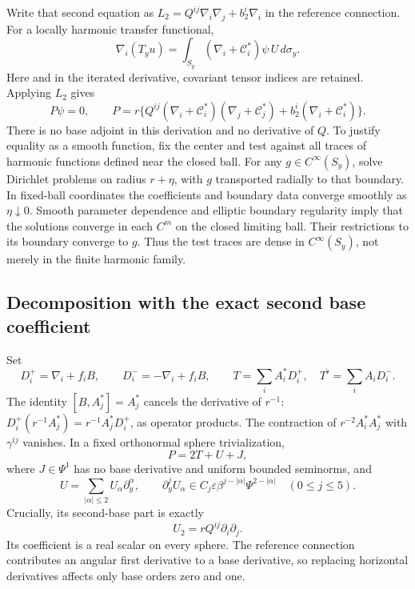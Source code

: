 \documentclass[11pt]{article}
\theoremstyle{definition}
\theoremstyle{remark}
\numberwithin{equation}{section}
\begin{document}
Write that second equation as
$L_2=Q^{ij}\nabla_i\nabla_j+b_2^i\nabla_i$ in the reference connection.
For a locally harmonic transfer functional,
\[
 \nabla_i(T_yu)
 =\int_{S_y}(\nabla_i+\mathcal C_i^*)\psi\,U\,d\sigma_y.
\]
Here and in the iterated derivative, covariant tensor indices are retained.
Applying $L_2$ gives
\begin{equation}\label{angular-expanded:P-equation}
 P\psi=0,\qquad
 P=r\{Q^{ij}(\nabla_i+\mathcal C_i^*)
                  (\nabla_j+\mathcal C_j^*)
                   +b_2^i(\nabla_i+\mathcal C_i^*)\}.
\end{equation}
There is no base adjoint in this derivation and no derivative of $Q$.
To justify equality as a smooth function, fix the center and test against
all traces of harmonic functions defined near the closed ball.  For any
$g\in C^\infty(S_y)$, solve Dirichlet problems on radius $r+\eta$, with
$g$ transported radially to that boundary.  In fixed-ball coordinates the
coefficients and boundary data converge smoothly as $\eta\downarrow0$.
Smooth parameter dependence and elliptic boundary regularity imply that
the solutions converge in each $C^m$ on the closed limiting ball.  Their
restrictions to its boundary converge to $g$.  Thus the test traces are
dense in $C^\infty(S_y)$, not merely in the finite harmonic family.

\subsection{Decomposition with the exact second base coefficient}

Set
\begin{equation}\label{angular-expanded:T-definition}
 D_i^+=\nabla_i+f_iB,\qquad D_i^-=-\nabla_i+f_iB,\qquad
 T=\sum_iA_i^*D_i^+,\quad T^\flat=\sum_iA_iD_i^-.
\end{equation}
The identity $[B,A_j^*]=A_j^*$ cancels the derivative of $r^{-1}$:
$D_i^+(r^{-1}A_j^*)=r^{-1}A_j^*D_i^+$, as operator products.
The contraction of $r^{-2}A_i^*A_j^*$ with $\gamma^{ij}$ vanishes.
In a fixed orthonormal sphere trivialization,
\begin{equation}\label{angular-expanded:P-decomposition}
 P=2T+U+J,
\end{equation}
where $J\in\Psi^1$ has no base derivative and uniform bounded seminorms,
and
\begin{equation}\label{angular-expanded:U-bounds}
 U=\sum_{|\alpha|\leq2}U_\alpha\partial_y^\alpha,
 \qquad
 \partial_y^jU_\alpha\in
 C_j\varepsilon\beta^{j-|\alpha|}\Psi^{2-|\alpha|}
 \quad(0\leq j\leq5).
\end{equation}
Crucially, its second-base part is exactly
\begin{equation}\label{angular-expanded:real-principal-part}
 U_2=rQ^{ij}\partial_i\partial_j.
\end{equation}
Its coefficient is a real scalar on every sphere.  The reference
connection contributes an angular first derivative to a base derivative,
so replacing horizontal derivatives affects only base orders zero and one.
\end{document}

